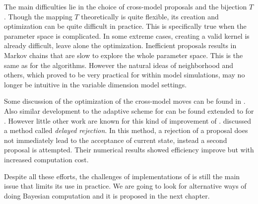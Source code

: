 The main difficulties lie in the choice of cross-model proposals and the
bijection $T$. Though the mapping $T$ theoretically is quite flexible, its
creation and optimization can be quite difficult in practice. This is
specifically true when the parameter space is complicated. In some extreme
cases, creating a valid kernel is already difficult, leave alone the
optimization. Inefficient proposals results in Markov chains that are slow to
explore the whole parameter space. This is the same as for the \mcmc
algorithms. However the natural ideas of neighborhood and others, which proved
to be very practical for within model simulations, may no longer be intuitive
in the variable dimension model settings.

Some discussion of the optimization of the cross-model moves can be found in
\textcite{Green:2009tr}. Also similar development to the adaptive scheme for \mha
can be found extended to for \rjmcmc \parencite[for example][]{Hastie:2005vi}.
However little other work are known for this kind of improvement of \rjmcmc.
\textcite{Green:2011tk} discussed a method called \emph{delayed rejection}. In
this method, a rejection of a proposal does not immediately lead to the
acceptance of current state, instead a second proposal is attempted. Their
numerical results showed efficiency improve but with increased computation
cost.

Despite all these efforts, the challenges of implementations of \rjmcmc is
still the main issue that limits its use in practice. We are going to look for
alternative ways of doing Bayesian computation and it is proposed in the next
chapter.
